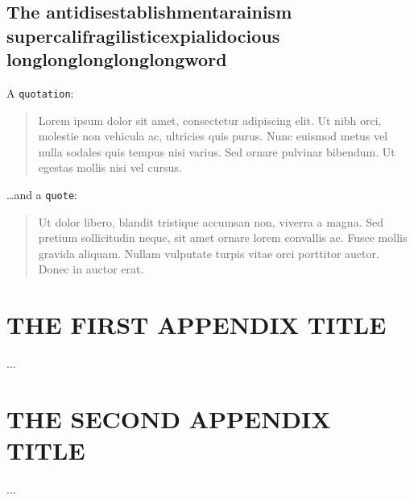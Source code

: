 \documentclass{umassthesis}          %
\begin{document}
\section{The antidisestablishmentarainism supercalifragilisticexpialidocious longlonglonglonglongword}

A \texttt{quotation}:

\begin{quotation}
Lorem ipsum dolor sit amet, consectetur adipiscing elit. Ut nibh orci, molestie
non vehicula ac, ultricies quis purus. Nunc euismod metus vel nulla sodales quis
tempus nisi varius. Sed ornare pulvinar bibendum. Ut egestas mollis nisi vel
cursus.
\end{quotation}

\dots and a \texttt{quote}:

\begin{quote}
Ut dolor libero, blandit tristique accumsan non, viverra a magna. Sed pretium
sollicitudin neque, sit amet ornare lorem convallis ac. Fusce mollis gravida
aliquam. Nullam vulputate turpis vitae orci porttitor auctor. Donec in auctor
erat.
\end{quote}




\appendix
\chapter{THE FIRST APPENDIX TITLE}
...
\chapter{THE SECOND APPENDIX TITLE}
...

\backmatter  %




\end{document}
